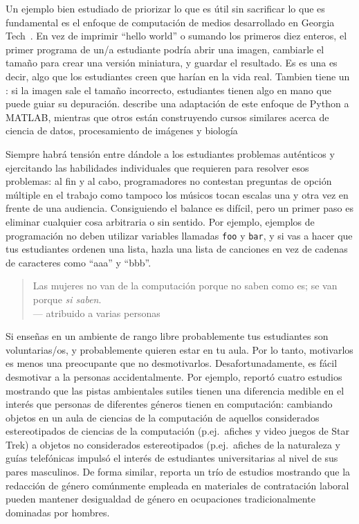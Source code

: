 Un ejemplo bien estudiado de priorizar lo que es útil
sin sacrificar lo que es fundamental
es el enfoque de computación de medios desarrollado en Georgia Tech~\cite{Guzd2013}.
En vez de imprimir ``hello world'' o sumando los primeros diez enteros,
el primer programa de un/a estudiante podría abrir una imagen,
cambiarle el tamaño para crear una versión miniatura,
y guardar el resultado.
Es es una 
es decir, algo que los estudiantes creen que harían en la vida real.
Tambien tiene un :
si la imagen sale el tamaño incorrecto,
estudiantes tienen algo en mano que puede guiar su depuración.
\cite{Lee2013} describe una adaptación de este enfoque de Python a MATLAB,
mientras que otros están construyendo cursos similares acerca de ciencia de datos, procesamiento de imágenes
y biología~\cite{Dahl2018,Meys2018,Ritz2018}

Siempre habrá tensión entre dándole a los estudiantes problemas auténticos
y ejercitando las habilidades individuales que requieren para resolver esos problemas:
al fin y al cabo,
programadores no contestan preguntas de opción múltiple en el trabajo
como tampoco los músicos tocan escalas una y otra vez en frente de una audiencia.
Consiguiendo el balance es difícil,
pero un primer paso es eliminar cualquier cosa arbitraria o sin sentido.
Por ejemplo,
ejemplos de programación no deben utilizar variables llamadas \texttt{foo} y \texttt{bar},
y si vas a hacer que tus estudiantes ordenen una lista,
hazla una lista de canciones en vez de cadenas de caracteres como ``aaa'' y ``bbb''.


\begin{quote}

  Las mujeres no van de la computación porque no saben como es;
  se van porque \emph{si saben}. \\
  --- atribuido a varias personas

\end{quote}

Si enseñas en un ambiente de rango libre
probablemente tus estudiantes son voluntarias/os,
y probablemente quieren estar en tu aula.
Por lo tanto, motivarlos es menos una preocupante que no desmotivarlos.
Desafortunadamente,
es fácil desmotivar a la personas accidentalmente.
Por ejemplo,
\cite{Cher2009} reportó cuatro estudios mostrando que
las pistas ambientales sutiles tienen una diferencia medible en el interés que personas de diferentes géneros tienen en computación:
cambiando objetos en un aula de ciencias de la computación de aquellos considerados estereotipados de ciencias de la computación
(p.ej.\ afiches y video juegos de Star Trek)
a objetos no considerados estereotipados (p.ej.\ afiches de la naturaleza y guías telefónicas
impulsó el interés de estudiantes universitarias al nivel de sus pares masculinos.
De forma similar, 
\cite{Gauc2011} reporta un trío de estudios mostrando que
la redacción de género comúnmente empleada en materiales de contratación laboral 
pueden mantener desigualdad de género en ocupaciones tradicionalmente dominadas por hombres.

